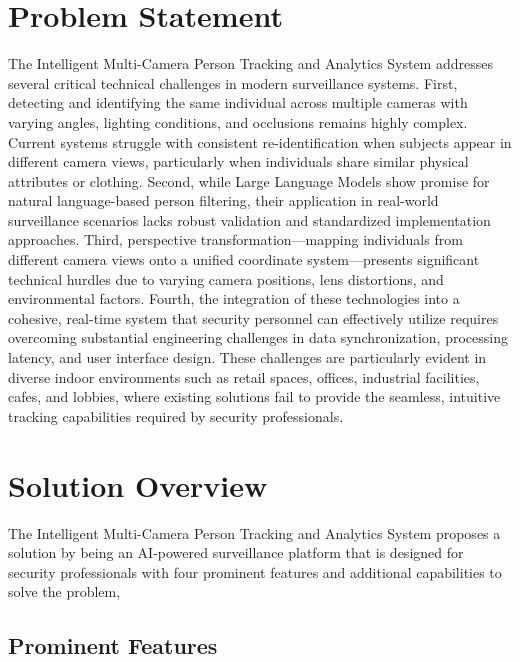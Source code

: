 \section{Problem Statement}
\label{section:problem-statement}

The Intelligent Multi-Camera Person Tracking and Analytics System addresses several critical technical challenges in modern surveillance systems. First, detecting and identifying the same individual across multiple cameras with varying angles, lighting conditions, and occlusions remains highly complex. Current systems struggle with consistent re-identification when subjects appear in different camera views, particularly when individuals share similar physical attributes or clothing. Second, while Large Language Models show promise for natural language-based person filtering, their application in real-world surveillance scenarios lacks robust validation and standardized implementation approaches. Third, perspective transformation—mapping individuals from different camera views onto a unified coordinate system—presents significant technical hurdles due to varying camera positions, lens distortions, and environmental factors. Fourth, the integration of these technologies into a cohesive, real-time system that security personnel can effectively utilize requires overcoming substantial engineering challenges in data synchronization, processing latency, and user interface design. These challenges are particularly evident in diverse indoor environments such as retail spaces, offices, industrial facilities, cafes, and lobbies, where existing solutions fail to provide the seamless, intuitive tracking capabilities required by security professionals.

\section{Solution Overview}
\label{section:solution-overview}

The Intelligent Multi-Camera Person Tracking and Analytics System proposes a solution by being an AI-powered surveillance platform
that is designed for security professionals with four prominent features and additional capabilities to solve the problem,

\subsection{Prominent Features}
\label{subsection:main-features}


